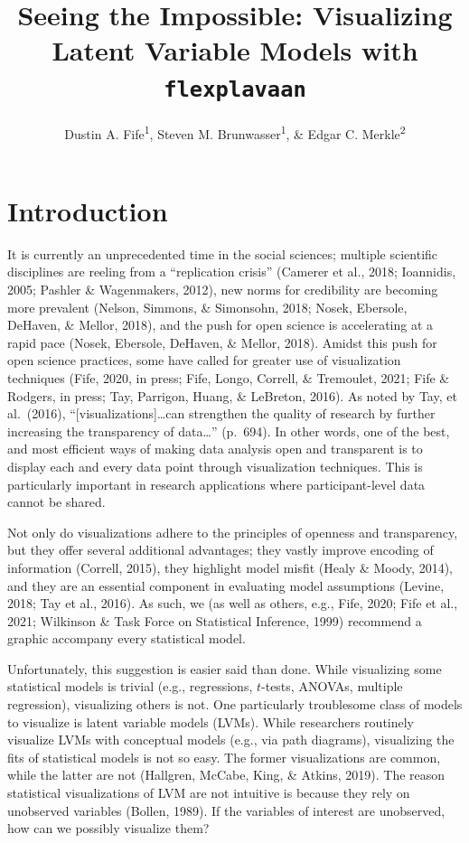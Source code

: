 \documentclass[
  english,
  man]{apa6}
\title{Seeing the Impossible: Visualizing Latent Variable Models with \texttt{flexplavaan}}
\author{Dustin A. Fife\textsuperscript{1}, Steven M. Brunwasser\textsuperscript{1}, \& Edgar C. Merkle\textsuperscript{2}}
\date{}
\affiliation{\vspace{0.5cm}\textsuperscript{1} Rowan University\\\textsuperscript{2} University of Missouri}
\begin{document}
\maketitle

\hypertarget{introduction}{%
\section{Introduction}\label{introduction}}

It is currently an unprecedented time in the social sciences; multiple scientific disciplines are reeling from a ``replication crisis'' (Camerer et al., 2018; Ioannidis, 2005; Pashler \& Wagenmakers, 2012), new norms for credibility are becoming more prevalent (Nelson, Simmons, \& Simonsohn, 2018; Nosek, Ebersole, DeHaven, \& Mellor, 2018), and the push for open science is accelerating at a rapid pace (Nosek, Ebersole, DeHaven, \& Mellor, 2018). Amidst this push for open science practices, some have called for greater use of visualization techniques (Fife, 2020, in press; Fife, Longo, Correll, \& Tremoulet, 2021; Fife \& Rodgers, in press; Tay, Parrigon, Huang, \& LeBreton, 2016). As noted by Tay, et al.~(2016), ``{[}visualizations{]}\ldots can strengthen the quality of research by further increasing the transparency of data\ldots{}'' (p.~694). In other words, one of the best, and most efficient ways of making data analysis open and transparent is to display each and every data point through visualization techniques. This is particularly important in research applications where participant-level data cannot be shared.

Not only do visualizations adhere to the principles of openness and transparency, but they offer several additional advantages; they vastly improve encoding of information (Correll, 2015), they highlight model misfit (Healy \& Moody, 2014), and they are an essential component in evaluating model assumptions (Levine, 2018; Tay et al., 2016). As such, we (as well as others, e.g., Fife, 2020; Fife et al., 2021; Wilkinson \& Task Force on Statistical Inference, 1999) recommend a graphic accompany every statistical model.

Unfortunately, this suggestion is easier said than done. While visualizing some statistical models is trivial (e.g., regressions, \(t\)-tests, ANOVAs, multiple regression), visualizing others is not. One particularly troublesome class of models to visualize is latent variable models (LVMs). While researchers routinely visualize LVMs with conceptual models (e.g., via path diagrams), visualizing the fits of statistical models is not so easy. The former visualizations are common, while the latter are not (Hallgren, McCabe, King, \& Atkins, 2019). The reason statistical visualizations of LVM are not intuitive is because they rely on unobserved variables (Bollen, 1989). If the variables of interest are unobserved, how can we possibly visualize them?
\end{document}
